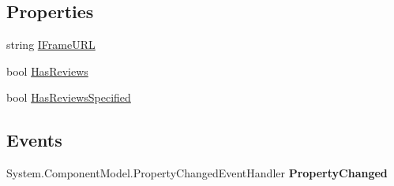 \subsection*{Properties}
\begin{DoxyCompactItemize}
\item 
\hypertarget{class_amazon___price___finder_1_1amazon_1_1ecs_1_1_customer_reviews_a7d27dd3f60296c6e5703df086f3304e7}{string \hyperlink{class_amazon___price___finder_1_1amazon_1_1ecs_1_1_customer_reviews_a7d27dd3f60296c6e5703df086f3304e7}{I\-Frame\-U\-R\-L}}\label{class_amazon___price___finder_1_1amazon_1_1ecs_1_1_customer_reviews_a7d27dd3f60296c6e5703df086f3304e7}

\begin{DoxyCompactList}\small\item\em \end{DoxyCompactList}\item 
\hypertarget{class_amazon___price___finder_1_1amazon_1_1ecs_1_1_customer_reviews_ad4f194ffb811ebec214e82b50b509b1a}{bool \hyperlink{class_amazon___price___finder_1_1amazon_1_1ecs_1_1_customer_reviews_ad4f194ffb811ebec214e82b50b509b1a}{Has\-Reviews}}\label{class_amazon___price___finder_1_1amazon_1_1ecs_1_1_customer_reviews_ad4f194ffb811ebec214e82b50b509b1a}

\begin{DoxyCompactList}\small\item\em \end{DoxyCompactList}\item 
\hypertarget{class_amazon___price___finder_1_1amazon_1_1ecs_1_1_customer_reviews_a9f5476ddfb7e3aa51d3d62c34d2789ee}{bool \hyperlink{class_amazon___price___finder_1_1amazon_1_1ecs_1_1_customer_reviews_a9f5476ddfb7e3aa51d3d62c34d2789ee}{Has\-Reviews\-Specified}}\label{class_amazon___price___finder_1_1amazon_1_1ecs_1_1_customer_reviews_a9f5476ddfb7e3aa51d3d62c34d2789ee}

\begin{DoxyCompactList}\small\item\em \end{DoxyCompactList}\end{DoxyCompactItemize}
\subsection*{Events}
\begin{DoxyCompactItemize}
\item 
\hypertarget{class_amazon___price___finder_1_1amazon_1_1ecs_1_1_customer_reviews_ab9a373773b73f4b3d986b9190b3f413d}{System.\-Component\-Model.\-Property\-Changed\-Event\-Handler {\bfseries Property\-Changed}}\label{class_amazon___price___finder_1_1amazon_1_1ecs_1_1_customer_reviews_ab9a373773b73f4b3d986b9190b3f413d}

\end{DoxyCompactItemize}


